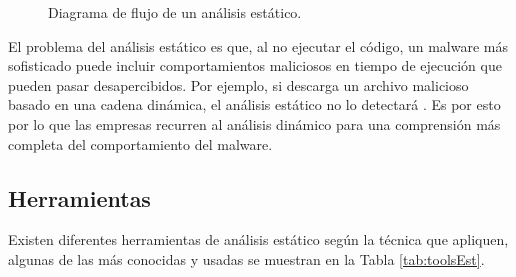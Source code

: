 \begin{figure}[h!]
\begin{center}
{}
\end{center}
\caption{Diagrama de flujo de un análisis estático.}
\label{fig:staticFlow}
\end{figure}

El problema del análisis estático es que, al no ejecutar el código, un malware más sofisticado puede incluir comportamientos maliciosos en tiempo de ejecución que pueden pasar desapercibidos. Por ejemplo, si descarga un archivo malicioso basado en una cadena dinámica, el análisis estático no lo detectará \cite{117}. Es por esto por lo que las empresas recurren al análisis dinámico para una comprensión más completa del comportamiento del malware.

\subsection{Herramientas}

\noindent Existen diferentes herramientas de análisis estático según la técnica que apliquen, algunas de las más conocidas y usadas se muestran en la Tabla \ref{tab:toolsEst}.

